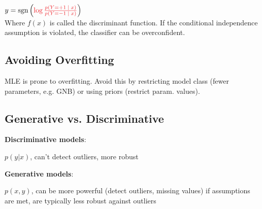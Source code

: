 \qquad \qquad $y = \sgn \left( \color{Red} \log \frac{p(Y = +1 \; | \; x)}{p(Y = -1 \; | \; x)} \color{Black} \right)$ \\[-3pt]

Where \color{Red}$f(x)$\color{Black} is called the discriminant function. If the conditional independence assumption is violated, the classifier can be overconfident.

\subsection*{Avoiding Overfitting}

MLE is prone to overfitting. Avoid this by restricting model class (fewer parameters, e.g. GNB) or using priors (restrict param. values).

\subsection*{Generative vs. Discriminative}

\textbf{Discriminative models}:

$p(y | x)$, can't detect outliers, more robust

\textbf{Generative models}:

$p(x,y)$, can be more powerful (detect outliers, missing values) if assumptions are met, are typically less robust against outliers

